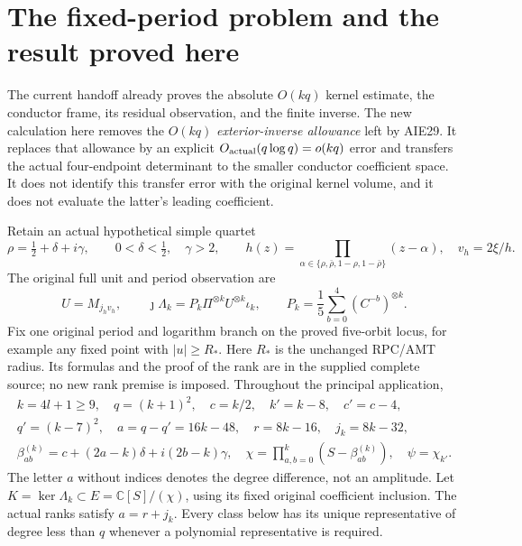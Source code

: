 \documentclass[11pt,a4paper]{article}
\begin{document}

\clearpage
\section{The fixed-period problem and the result proved here}
\label{sec:FEX-scope}
The current handoff already proves the absolute $O(kq)$ kernel estimate,
the conductor frame, its residual observation, and the finite inverse.
The new calculation here removes the $O(kq)$ \emph{exterior-inverse
allowance} left by AIE29. It replaces that allowance by an explicit
$O_{\rm actual}(q\log q)=o(kq)$ error and transfers the actual
four-endpoint determinant to the smaller conductor coefficient space.
It does not identify this transfer error with the original kernel
volume, and it does not evaluate the latter's leading coefficient.

Retain an actual hypothetical simple quartet
\[
 \rho=\tfrac12+\delta+i\gamma,\qquad0<\delta<\tfrac12,\quad\gamma>2,
 \qquad h(z)=\prod_{\alpha\in\{\rho,\bar\rho,1-\rho,1-\bar\rho\}}(z-\alpha),
 \quad v_h=2\xi/h.
\]
The original full unit and period observation are
\[
 U=M_{j_hv_h},\qquad
 \jmath\Lambda_k=P_k\Pi^{\otimes k}U^{\otimes k}\iota_k,
 \qquad P_k=\frac15\sum_{b=0}^4(C^{-b})^{\otimes k}.
 \tag{FEX1}
\]
Fix one original period and logarithm branch on the proved five-orbit
locus, for example any fixed point with $|u|\ge R_*$. Here $R_*$ is the
unchanged RPC/AMT radius. Its formulas and the proof of the rank are in
the supplied complete source; no new rank premise is imposed.
Throughout the principal application,
\[
\begin{gathered}
 k=4l+1\ge9,\quad q=(k+1)^2,\quad c=k/2,\quad k'=k-8,\quad c'=c-4,\\
 q'=(k-7)^2,\quad a=q-q'=16k-48,\quad r=8k-16,\quad j_k=8k-32,\\
 \beta_{ab}^{(k)}=c+(2a-k)\delta+i(2b-k)\gamma,\quad
 \chi=\prod_{a,b=0}^k(S-\beta_{ab}^{(k)}),\quad \psi=\chi_{k'}.
\end{gathered}\tag{FEX2}
\]
The letter $a$ without indices denotes the degree difference, not an
amplitude. Let $K=\ker\Lambda_k\subset E=\mathbb C[S]/(\chi)$, using its
fixed original coefficient inclusion. The actual ranks satisfy
$a=r+j_k$. Every class below has its unique representative of degree
less than $q$ whenever a polynomial representative is required.
\end{document}
